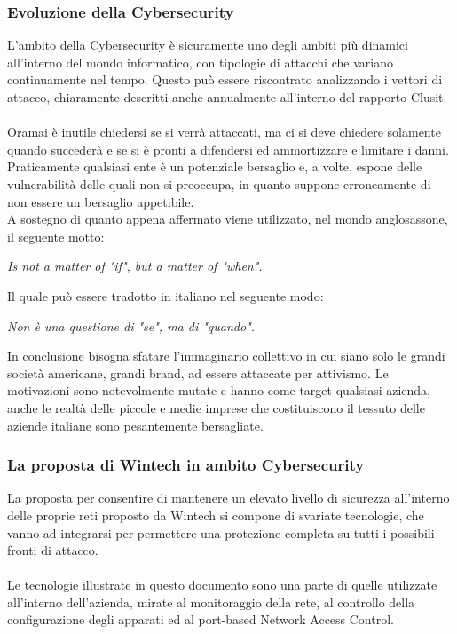 \documentclass[Tesi.tex]{subfiles}
\begin{document}
\subsubsection{Evoluzione della Cybersecurity}
L'ambito della Cybersecurity è sicuramente uno degli ambiti più dinamici all'interno del mondo informatico, con tipologie di attacchi che variano continuamente nel tempo. Questo può essere riscontrato analizzando i vettori di attacco, chiaramente descritti anche annualmente all'interno del rapporto Clusit. \\\\
Oramai è inutile chiedersi se si verrà attaccati, ma ci si deve chiedere solamente quando succederà e se si è pronti a difendersi ed ammortizzare e limitare i danni. 
Praticamente qualsiasi ente è un potenziale bersaglio e, a volte, espone delle vulnerabilità delle quali non si preoccupa, in quanto suppone erroneamente di non essere un bersaglio appetibile. \\
A sostegno di quanto appena affermato viene utilizzato, nel mondo anglosassone, il seguente motto:
\begin{center} \textsl{Is not a matter of "if", but a matter of "when".} \end{center}
Il quale può essere tradotto in italiano nel seguente modo:
\begin{center} \textsl{Non è una questione di "se", ma di "quando".} \end{center}
In conclusione bisogna sfatare l'immaginario collettivo in cui siano solo le grandi società americane, grandi brand, ad essere attaccate per attivismo. Le motivazioni sono notevolmente mutate e hanno come target qualsiasi azienda, anche le realtà delle piccole e medie imprese che costituiscono il tessuto delle aziende italiane sono pesantemente bersagliate.

\subsubsection{La proposta di Wintech in ambito Cybersecurity}
La proposta per consentire di mantenere un elevato livello di sicurezza all'interno delle proprie reti proposto da Wintech si compone di svariate tecnologie, che vanno ad integrarsi per permettere una protezione completa su tutti i possibili fronti di attacco. \\\\
Le tecnologie illustrate in questo documento sono una parte di quelle utilizzate all'interno dell'azienda, mirate al monitoraggio della rete, al controllo della configurazione degli apparati ed al port-based Network Access Control.
\end{document}
